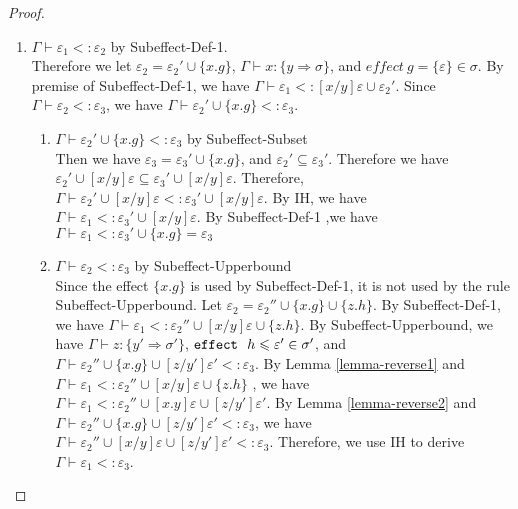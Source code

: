 \begin{proof}
\begin{enumerate}
\begin{enumerate}
    \item $\Gamma \vdash \varepsilon_1 <: \varepsilon_2$ by Subeffect-Def-1. \\
    Therefore we let $\varepsilon_2 = \varepsilon_2' \cup \{x.g\}$, $\Gamma\vdash x:\{y \Rightarrow \sigma\}$, and $effect\ g = \{\varepsilon\} \in \sigma$. By premise of Subeffect-Def-1, we have $\Gamma \vdash \varepsilon_1 <: [x/y]\varepsilon \cup \varepsilon_2'$. Since $\Gamma \vdash \varepsilon_2 <: \varepsilon_3$, we have \mbox{$\Gamma \vdash \varepsilon_2' \cup \{x.g\} <: \varepsilon_3$}. 
    \begin{enumerate}
        \item $\Gamma \vdash \varepsilon_2' \cup \{x.g\} <: \varepsilon_3$ by Subeffect-Subset\\
        Then we have $\varepsilon_3 = \varepsilon_3' \cup \{x.g\}$, and $\varepsilon_2' \subseteq \varepsilon_3'$. Therefore we have $\varepsilon_2' \cup [x/y]\varepsilon \subseteq \varepsilon_3' \cup [x/y] \varepsilon$. Therefore, $\Gamma \vdash\varepsilon_2' \cup [x/y]\varepsilon  <: \varepsilon_3' \cup [x/y] \varepsilon $. By IH, we have $\Gamma \vdash \varepsilon_1 <: \varepsilon_3' \cup [x/y] \varepsilon$. By Subeffect-Def-1 ,we have $\Gamma\vdash \varepsilon_1 <: \varepsilon_3' \cup \{x.g\} = \varepsilon_3$
        \item $\Gamma \vdash \varepsilon_2 <: \varepsilon_3$ by Subeffect-Upperbound\\
      Since the effect $\{x.g\}$ is used by Subeffect-Def-1, it is not used by the rule Subeffect-Upperbound. Let $\varepsilon_2 = \varepsilon_2'' \cup \{x.g\} \cup \{z.h\}$. By Subeffect-Def-1, we have \mbox{$\Gamma \vdash \varepsilon_1 <: \varepsilon_2'' \cup [x/y]\varepsilon \cup \{z.h\}$}. By Subeffect-Upperbound, we have 
      $\Gamma \vdash z:\{y' \Rightarrow \sigma'\}$,
      $\mathtt{effect}~\ h \leqslant \varepsilon' \in \sigma'$,
      and $\Gamma \vdash \varepsilon_2'' \cup \{x.g\} \cup [z/y']\varepsilon' <: \varepsilon_3$.
      By Lemma \ref{lemma-reverse1} and $\Gamma \vdash \varepsilon_1 <: \varepsilon_2'' \cup [x/y]\varepsilon \cup \{z.h\}$ , we have 
      $\Gamma \vdash \varepsilon_1 <: \varepsilon_2''\cup [x.y]\varepsilon \cup [z/y']\varepsilon'$.
      By Lemma \ref{lemma-reverse2} and $\Gamma \vdash \varepsilon_2'' \cup \{x.g\} \cup [z/y']\varepsilon' <: \varepsilon_3$, we have 
      $\Gamma \vdash \varepsilon_2'' \cup [x/y]\varepsilon \cup [z/y']\varepsilon' <: \varepsilon_3$.
      Therefore, we use IH to derive $\Gamma \vdash \varepsilon_1 <: \varepsilon_3$.
      

\end{enumerate}
\end{enumerate}
\end{enumerate}
\end{proof}
